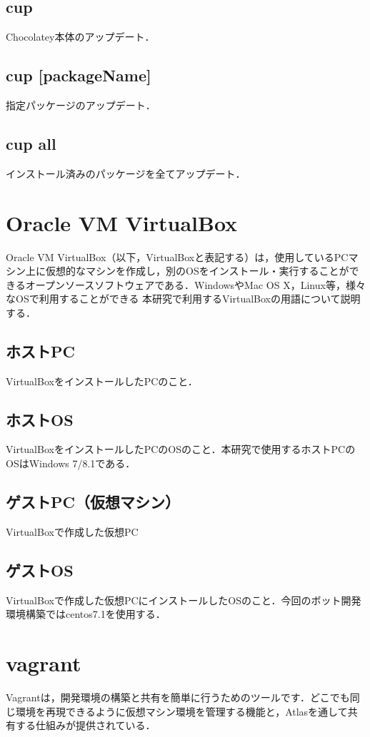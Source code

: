 \subsection{cup}
 Chocolatey本体のアップデート．
\subsection{cup [packageName]}
 指定パッケージのアップデート．
\subsection{cup all}
 インストール済みのパッケージを全てアップデート．



\section{Oracle VM VirtualBox}
Oracle VM VirtualBox（以下，VirtualBoxと表記する）は，使用しているPCマシン上に仮想的なマシンを作成し，別のOSをインストール・実行することができるオープンソースソフトウェアである．WindowsやMac OS X，Linux等，様々なOSで利用することができる
本研究で利用するVirtualBoxの用語について説明する．
\subsection{ホストPC}
VirtualBoxをインストールしたPCのこと．

\subsection{ホストOS}
VirtualBoxをインストールしたPCのOSのこと．本研究で使用するホストPCのOSはWindows 7/8.1である． 

\subsection{ゲストPC（仮想マシン）}
VirtualBoxで作成した仮想PC

\subsection{ゲストOS}
VirtualBoxで作成した仮想PCにインストールしたOSのこと．今回のボット開発環境構築ではcentos7.1を使用する．
\cite{vb}

\section{vagrant}
Vagrantは，開発環境の構築と共有を簡単に行うためのツールです．どこでも同じ環境を再現できるように仮想マシン環境を管理する機能と，Atlasを通して共有する仕組みが提供されている．\cite{vagrant}
